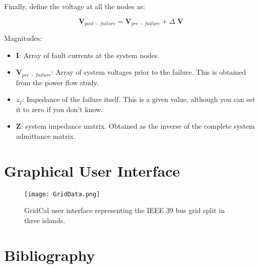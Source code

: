 \documentclass[11pt,fleqn]{book} %
\begin{document}
Finally, define the voltage at all the nodes as:

\begin{equation}
\textbf{V}_{post-failure} = \textbf{V}_{pre-failure} + \Delta \textbf{ V}
\end{equation}

Magnitudes:
\begin{itemize}
	\item $\textbf{I}$: Array of fault currents at the system nodes.
	\item $\textbf{V}_{pre-failure}$: Array of system voltages prior to the failure. This is obtained from the power flow study.
	\item $z_f$: Impedance of the failure itself. This is a given value, although you can set it to zero if you don't know.
	\item $\textbf{Z}$: system impedance matrix. Obtained as the inverse of the complete system admittance matrix.
	
\end{itemize}


\chapter{Graphical User Interface}

\begin{figure}[h!]
	\centering
	\texttt{[image: GridData.png]}
	\caption{GridCal user interface representing the IEEE 39 bus grid split in three islands.}
	\label{fig:main_gui}
\end{figure}

\chapter*{Bibliography}
%
%
\printbibliography
\end{document}
